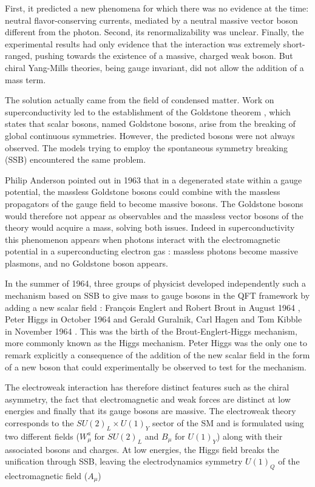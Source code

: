 First, it predicted a new phenomena for which there was no evidence at the time: neutral flavor-conserving currents, mediated by a neutral massive vector boson different from the photon. Second, its renormalizability was unclear. Finally, the experimental results had only evidence that the interaction was extremely short-ranged, pushing towards the existence of a massive, charged weak boson. But chiral Yang-Mills theories, being gauge invariant, did not allow the addition of a mass term.

The solution actually came from the field of condensed matter. Work on superconductivity led to the establishment of the Goldstone theorem \cite{PhysRev.127.965}, which states that scalar bosons, named Goldstone bosons, arise from the breaking of global continuous symmetries. However, the predicted bosons were not always observed. The models trying to employ the spontaneous symmetry breaking (SSB) encountered the same problem.

Philip Anderson pointed out in 1963 \cite{PhysRev.130.439} that in a degenerated state within a gauge potential, the massless Goldstone bosons could combine with the massless propagators of the gauge field to become massive bosons. The Goldstone bosons would therefore not appear as observables and the massless vector bosons of the theory would acquire a mass, solving both issues. Indeed in superconductivity this phenomenon appears when photons interact with the electromagnetic potential in a superconducting electron gas : massless photons become massive plasmons, and no Goldstone boson appears.

In the summer of 1964, three groups of physicist developed independently such a mechanism based on SSB to give mass to gauge bosons in the QFT framework by adding a new scalar field : François Englert and Robert Brout in August 1964 \cite{PhysRevLett.13.321}, Peter Higgs in October 1964 \cite{HIGGS1964132,PhysRevLett.13.508} and Gerald Guralnik, Carl Hagen and Tom Kibble in November 1964 \cite{PhysRevLett.13.585}. This was the birth of the Brout-Englert-Higgs mechanism, more commonly known as the Higgs mechanism. Peter Higgs was the only one to remark explicitly a consequence of the addition of the new scalar field in the form of a new boson that could experimentally be observed to test for the mechanism. 

The electroweak interaction has therefore distinct features such as the chiral asymmetry, the fact that electromagnetic and weak forces are distinct at low energies and finally that its gauge bosons are massive. The electroweak theory corresponds to the $SU(2)_L \times U(1)_Y$ sector of the SM and is formulated using two different fields ($W_{\mu}^a$ for $SU(2)_L$ and $B_{\mu}$ for $U(1)_Y$) along with their associated bosons and charges. At low energies, the Higgs field breaks the unification through SSB, leaving the electrodynamics symmetry $U(1)_Q$ of the electromagnetic field ($A_{\mu}$)

